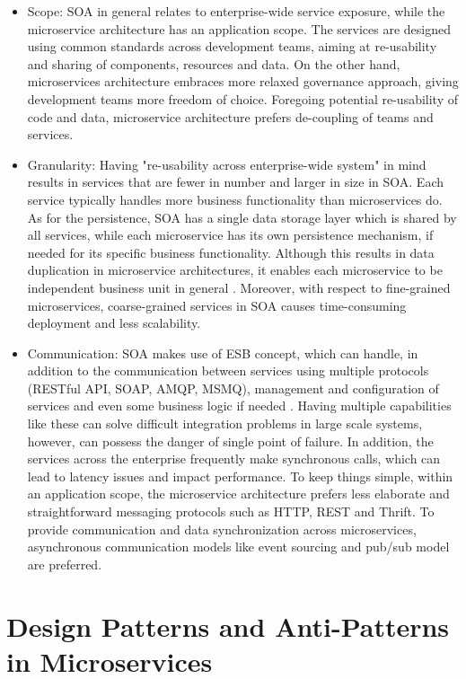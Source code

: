 \documentclass{Configuration_Files/PoliMi3i_thesis}
\begin{document}
\begin{itemize}
    \item Scope: SOA in general relates to enterprise-wide service exposure, while the microservice architecture has an application scope.
    The services are designed using common standards across development teams, aiming at re-usability and sharing of components, resources and data. On the other hand, microservices architecture embraces more relaxed governance approach, giving development teams more freedom of choice.
    Foregoing potential re-usability of code and data, microservice architecture prefers de-coupling of teams and services.
    
    \item Granularity: Having "re-usability across enterprise-wide system" in mind results in services that are fewer in number and larger in size in SOA. Each service typically handles more business functionality than microservices do. As for the persistence, SOA has a single data storage layer which is shared by all services, while each microservice has its own persistence mechanism, if needed for its specific business functionality. Although this results in data duplication in microservice architectures, it enables each microservice to be independent business unit in general \cite{soa_granularity}.
    Moreover, with respect to fine-grained microservices, coarse-grained services in SOA causes time-consuming deployment and less scalability.
    
    \item Communication: SOA makes use of ESB concept, which can handle, in addition to the communication between services using multiple protocols (RESTful API, SOAP, AMQP, MSMQ), management and configuration of services and even some business logic if needed \cite{soa_comm}.
    Having multiple capabilities like these can solve difficult integration problems in large scale systems, however, can possess the danger of single point of failure.
    In addition, the services across the enterprise frequently make synchronous calls, which can lead to latency issues and impact performance.
    To keep things simple, within an application scope, the microservice architecture prefers less elaborate and straightforward  messaging protocols such as HTTP, REST and Thrift.
    To provide communication and data synchronization across microservices, asynchronous communication models like event sourcing and pub/sub model are preferred.
\end{itemize}

\section{Design Patterns and Anti-Patterns in Microservices}
\label{sec:patterns}
\end{document}
